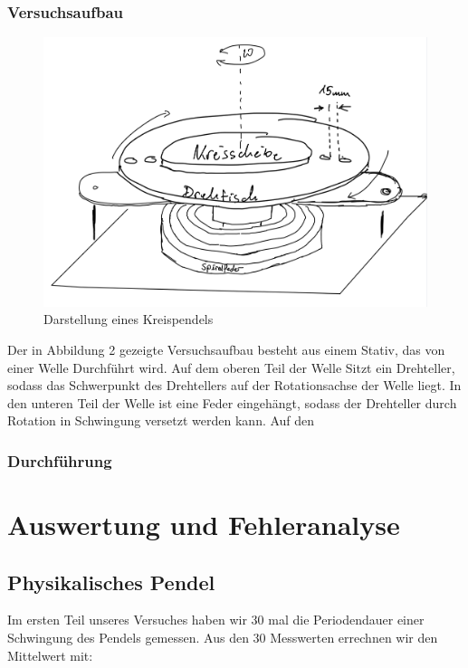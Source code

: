 \documentclass[11pt,a4paper]{article}
\begin{document}
     \subsubsection{Versuchsaufbau}
     \begin{figure}[H]
     	\includegraphics[width=0.6\linewidth]{Drehpendel.png}
     	\centering
     	\caption{Darstellung eines Kreispendels}
     \end{figure}
 Der in Abbildung 2 gezeigte Versuchsaufbau besteht aus einem Stativ, das von einer Welle Durchführt wird. Auf dem oberen Teil der Welle Sitzt ein Drehteller, sodass das Schwerpunkt des Drehtellers auf der Rotationsachse der Welle liegt. In den unteren Teil der Welle ist eine Feder eingehängt, sodass der Drehteller durch Rotation in Schwingung versetzt werden kann. Auf den
     \subsubsection{Durchführung}








\newpage
\section{Auswertung und Fehleranalyse}
	\subsection{Physikalisches Pendel}

	Im ersten Teil unseres Versuches haben wir 30 mal die Periodendauer einer Schwingung des Pendels
	gemessen. Aus den 30 Messwerten errechnen wir den Mittelwert mit:
\end{document}
